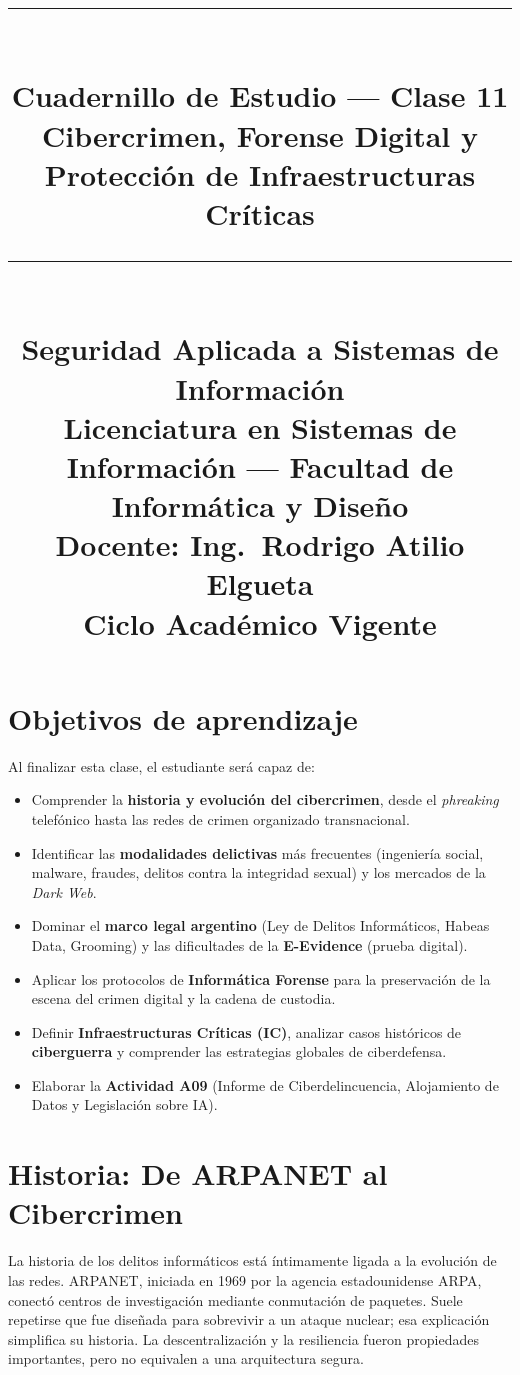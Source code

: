 \documentclass[11pt,a4paper]{article}
\title{%
  \rule{\textwidth}{1pt}\\[0.3cm]
  \textbf{\Large Cuadernillo de Estudio --- Clase 11}\\[0.2cm]
  \large Cibercrimen, Forense Digital y Protección de Infraestructuras Críticas\\[0.2cm]
  \rule{\textwidth}{1pt}\\[0.3cm]
  \normalsize Seguridad Aplicada a Sistemas de Información\\
  Licenciatura en Sistemas de Información --- Facultad de Informática y Diseño\\
  Docente: Ing.\ Rodrigo Atilio Elgueta\\[0.2cm]
  \small Ciclo Académico Vigente
}
\author{}
\date{}
\begin{document}
\maketitle
\thispagestyle{fancy}
\tableofcontents
\newpage

\section{Objetivos de aprendizaje}
Al finalizar esta clase, el estudiante será capaz de:
\begin{itemize}[leftmargin=*]
  \item Comprender la \textbf{historia y evolución del cibercrimen}, desde el \textit{phreaking} telefónico hasta las redes de crimen organizado transnacional.
  \item Identificar las \textbf{modalidades delictivas} más frecuentes (ingeniería social, malware, fraudes, delitos contra la integridad sexual) y los mercados de la \textit{Dark Web}.
  \item Dominar el \textbf{marco legal argentino} (Ley de Delitos Informáticos, Habeas Data, Grooming) y las dificultades de la \textbf{E-Evidence} (prueba digital).
  \item Aplicar los protocolos de \textbf{Informática Forense} para la preservación de la escena del crimen digital y la cadena de custodia.
  \item Definir \textbf{Infraestructuras Críticas (IC)}, analizar casos históricos de \textbf{ciberguerra} y comprender las estrategias globales de ciberdefensa.
  \item Elaborar la \textbf{Actividad A09} (Informe de Ciberdelincuencia, Alojamiento de Datos y Legislación sobre IA).
\end{itemize}

\section{Historia: De ARPANET al Cibercrimen}
La historia de los delitos informáticos está íntimamente ligada a la evolución de las redes. ARPANET, iniciada en 1969 por la agencia estadounidense ARPA, conectó centros de investigación mediante conmutación de paquetes. Suele repetirse que fue diseñada para sobrevivir a un ataque nuclear; esa explicación simplifica su historia. La descentralización y la resiliencia fueron propiedades importantes, pero no equivalen a una arquitectura segura.
\end{document}
